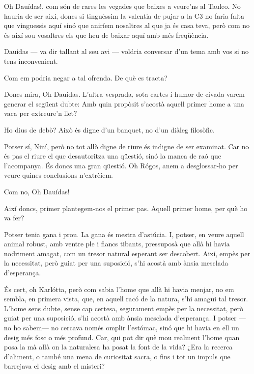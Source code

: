 \begin{platdialogue}
\item[\speaker{Aimílios:}] Oh Dauídas!, com són de rares les vegades que baixes a veure'ns al Tauleo. No hauria de ser així, doncs si tinguéssim la valentia de pujar a la C3 no faria falta que vinguessis aquí sinó que aniríem nosaltres al que ja és casa teva, però com no és així sou vosaltres els que heu de baixar aquí amb més freqüència.
\item[\speaker{Rógos:}] Dauídas --- va dir tallant al seu avi --- voldria conversar d'un tema amb vos si no tens inconvenient.
\item[\speaker{Dauídas:}] Com em podria negar a tal ofrenda. De què es tracta?
\item[\speaker{Rógos:}] Doncs mira, Oh Dauídas. L'altra vesprada, sota cartes i humor de civada varem generar el següent dubte: Amb quin propòsit s’acostà aquell primer home a una vaca per extreure’n llet?
\item[\speaker{Niní:}]Ho dius de debò? Això és digne d’un banquet, no d’un diàleg filosòfic.
\item[\speaker{Dauídas:}] Potser sí, Niní, però no tot allò digne de riure és indigne de ser examinat. Car no és pas el riure el que desautoritza una qüestió, sinó la manca de raó que l’acompanya. És doncs una gran qüestió. Oh Rógos, anem a desglossar-ho per veure quines conclusions n'extrèiem.
\item[\speaker{Rógos:}] Com no, Oh Dauídas!
\item[\speaker{Dauídas:}] Així doncs, primer plantegem-nos el primer pas. Aquell primer home, per què ho va fer?
\item[\speaker{Karlótta:}] Potser tenia gana i prou. La gana és mestra d’astúcia. I, potser, en veure aquell animal robust, amb ventre ple i flancs tibants, pressuposà que allà hi havia nodriment amagat, com un tresor natural esperant ser descobert. Així, empès per la necessitat, però guiat per una suposició, s’hi acostà amb ànsia mesclada d’esperança.
\item[\speaker{Dauídas:}] És cert, oh Karlótta, però com sabia l'home que allà hi havia menjar, no em sembla, en primera vista, que, en aquell racó de la natura, s'hi amagui tal tresor. L'home sens dubte, sense cap certesa, segurament empès per la necessitat, però guiat per una suposició, s’hi acostà amb ànsia mesclada d’esperança. I potser —no ho sabem— no cercava només omplir l’estómac, sinó que hi havia en ell un desig més fosc o més profund. Car, qui pot dir què mou realment l’home quan posa la mà allà on la naturalesa ha posat la font de la vida? ¿Era la recerca d’aliment, o també una mena de curiositat sacra, o fins i tot un impuls que barrejava el desig amb el misteri?

\end{platdialogue}
